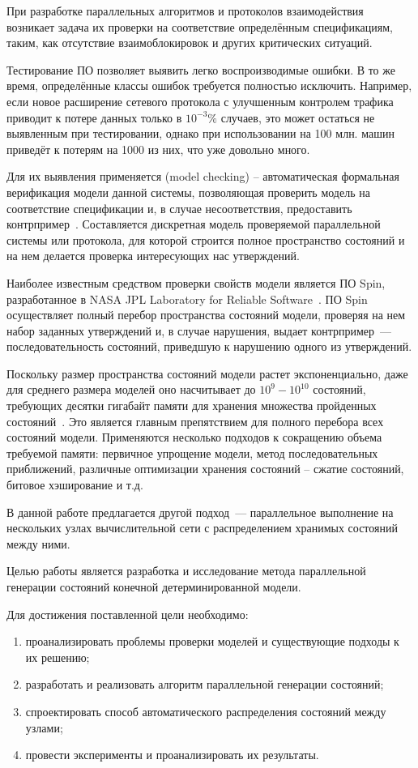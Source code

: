 \Introduction

При разработке параллельных алгоритмов и протоколов взаимодействия возникает задача их
проверки на соответствие определённым спецификациям, таким, как отсутствие
взаимоблокировок и других критических ситуаций.

Тестирование ПО позволяет выявить легко воспроизводимые ошибки. В то же время,
определённые классы ошибок требуется полностью исключить. Например, если новое расширение
сетевого протокола с улучшенным контролем трафика приводит к потере данных только в
$10^{-3}\%$ случаев, это может остаться не выявленным при тестировании, однако при
использовании на 100 млн. машин приведёт к потерям на 1000 из них, что уже довольно много.

Для их выявления применяется  (model checking) --
автоматическая формальная верификация модели данной системы, позволяющая проверить модель
на соответствие спецификации и, в случае несоответствия, предоставить
контрпример~\cite{Clarke}. Составляется дискретная модель проверяемой параллельной системы
или протокола, для которой строится полное пространство состояний и на нем делается
проверка интересующих нас утверждений.

Наиболее известным средством проверки свойств модели является ПО Spin, разработанное в
NASA JPL Laboratory for Reliable Software~\cite{SPIN}. ПО Spin осуществляет полный перебор
пространства состояний модели, проверяя на нем набор заданных утверждений и, в случае
нарушения, выдает контрпример~--- последовательность состояний, приведшую к нарушению
одного из утверждений.

Поскольку размер пространства состояний модели растет экспоненциально, даже для среднего
размера моделей оно насчитывает до $10^9 - 10^{10}$ состояний, требующих десятки гигабайт
памяти для хранения множества пройденных состояний~\cite{SpinRoot}. Это является главным
препятствием для полного перебора всех состояний модели. Применяются несколько подходов к
сокращению объема требуемой памяти: первичное упрощение модели, метод последовательных
приближений, различные оптимизации хранения состояний -- сжатие состояний, битовое
хэширование и т.д.~\cite{Katoen}

В данной работе предлагается другой подход~--- параллельное выполнение на нескольких узлах
вычислительной сети с распределением хранимых состояний между ними.

Целью работы является разработка и исследование метода параллельной генерации состояний
конечной детерминированной модели.

Для достижения поставленной цели необходимо:
\begin{enumerate}
\item проанализировать проблемы проверки моделей и существующие подходы к их решению;
\item разработать и реализовать алгоритм параллельной генерации состояний;
\item спроектировать способ автоматического распределения состояний между узлами;
\item провести эксперименты и проанализировать их результаты.
\end{enumerate}

